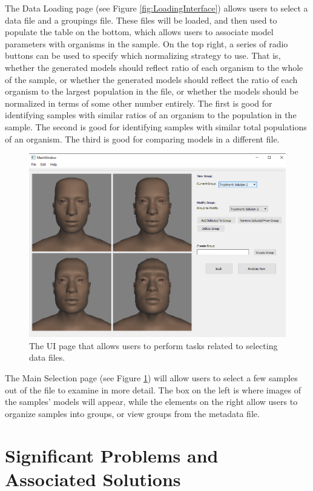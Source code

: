 \documentclass[letterpaper,10pt, onecolumn, draftclsnofoot]{IEEEtran}
\begin{document}
The Data Loading page (see Figure \ref{fig:LoadingInterface}) allows users to select a data file and a groupings file. These files will be loaded, and then used to populate the table on the bottom, which allows users to associate model parameters with organisms in the sample. On the top right, a series of radio buttons can be used to specify which normalizing strategy to use. That is, whether the generated models should reflect ratio of each organism to the whole of the sample, or whether the generated models should reflect the ratio of each organism to the largest population in the file, or whether the models should be normalized in terms of some other number entirely. The first is good for identifying samples with similar ratios of an organism to the population in the sample. The second is good for identifying samples with similar total populations of an organism. The third is good for comparing models in a different file.

\begin{figure}
	\includegraphics[width=\textwidth]{Comparison.PNG}
	\caption{The UI page that allows users to perform tasks related to selecting data files.}
	\label{fig:MainInterface}
\end{figure}

The Main Selection page (see Figure \ref{fig:MainInterface}) will allow users to select a few samples out of the file to examine in more detail. The box on the left is where images of the samples' models will appear, while the elements on the right allow users to organize samples into groups, or view groups from the metadata file.

\section{Significant Problems and Associated Solutions}
\end{document}
